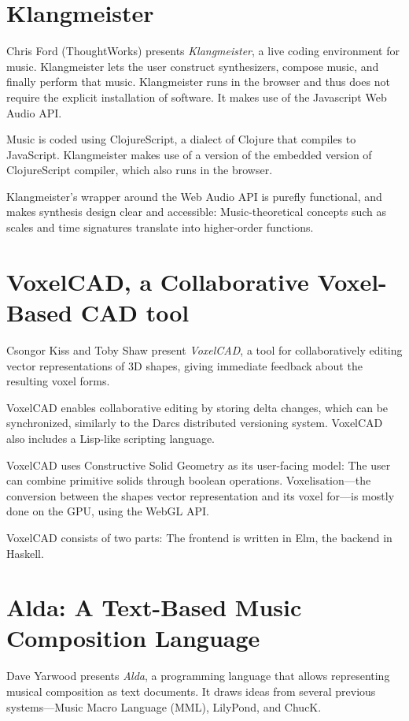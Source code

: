 \documentclass{sigplanconf}
\begin{document}
\section{Klangmeister}

Chris Ford (ThoughtWorks) presents \textit{Klangmeister}, a live
coding environment for music.  Klangmeister lets the user construct
synthesizers, compose music, and finally perform that music.
Klangmeister runs in the browser and thus does not require the
explicit installation of software.  It makes use of the Javascript Web
Audio API.

Music is coded using ClojureScript, a dialect of Clojure that
compiles to JavaScript.  Klangmeister makes use of a version of the
embedded version of ClojureScript compiler, which also runs in the
browser.

Klangmeister's wrapper around the Web Audio API is purefly functional,
and makes synthesis design clear and accessible:  Music-theoretical
concepts such as scales and time signatures translate into
higher-order functions.

\section{VoxelCAD, a Collaborative Voxel-Based CAD tool}

Csongor Kiss and Toby Shaw present \textit{VoxelCAD}, a tool for
collaboratively editing vector representations of 3D shapes, giving
immediate feedback about the resulting voxel forms.

VoxelCAD enables collaborative editing by storing delta changes, which
can be synchronized, similarly to the Darcs distributed versioning
system.  VoxelCAD also includes a Lisp-like scripting language.

VoxelCAD uses Constructive Solid Geometry as its user-facing model:
The user can combine primitive solids through boolean operations.
Voxelisation---the conversion between the shapes vector representation
and its voxel for---is mostly done on the GPU, using the WebGL API.

VoxelCAD consists of two parts: The frontend is written in Elm, the
backend in Haskell.

\section{Alda: A Text-Based Music Composition Language}

Dave Yarwood presents \textit{Alda}, a programming language that
allows representing musical composition as text documents.  It draws
ideas from several previous systems---Music Macro Language (MML),
LilyPond,  and ChucK.
\end{document}
